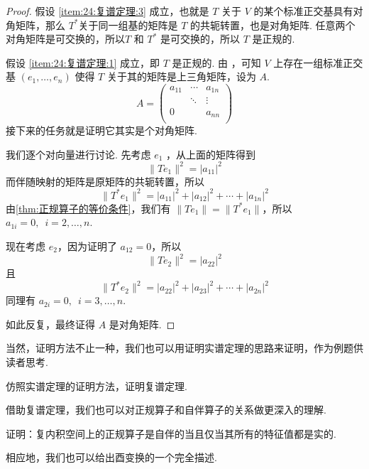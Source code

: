 \begin{proof}
    假设 \ref*{item:24:复谱定理:3} 成立，也就是 $ T $ 关于 $ V $ 的某个标准正交基具有对角矩阵，那么 $ T^* $关于同一组基的矩阵是 $ T $ 的共轭转置，也是对角矩阵. 任意两个对角矩阵是可交换的，所以$ T $ 和 $ T^* $ 是可交换的，所以 $ T $ 是正规的.

    假设 \ref*{item:24:复谱定理:1} 成立，即 $ T $ 是正规的. 由 ，可知 $ V $ 上存在一组标准正交基 $ (e_1, \ldots , e_n) $ 使得 $ T $ 关于其的矩阵是上三角矩阵，设为 $ A $.
    \[ A = \begin{pmatrix}
            a_{11} & \cdots & a_{1n} \\
                   & \ddots & \vdots \\
            0      &        & a_{nn} \\
        \end{pmatrix} \]
    接下来的任务就是证明它其实是个对角矩阵.

    我们逐个对向量进行讨论. 先考虑 $ e_1 $ ，从上面的矩阵得到
    \[ \lVert Te_1 \rVert^2 = \lvert a_{11} \rvert^2 \]
    而伴随映射的矩阵是原矩阵的共轭转置，所以
    \[ \lVert T^*e_1 \rVert^2 = \lvert a_{11} \rvert^2 + \lvert a_{12} \rvert^2 + \cdots + \lvert a_{1n} \rvert^2 \]
    由\autoref{thm:正规算子的等价条件}，我们有 $ \lVert Te_1 \rVert = \lVert T^*e_1 \rVert $，所以 $ a_{1i} = 0,\enspace i = 2, \ldots , n $.

    现在考虑 $ e_2 $，因为证明了 $ a_{12} = 0 $，所以
    \[ \lVert Te_2 \rVert^2 = \lvert a_{22} \rvert^2 \]
    且
    \[ \lVert T^*e_2 \rVert^2 = \lvert a_{22} \rvert^2 + \lvert a_{23} \rvert^2 + \cdots + \lvert a_{2n} \rvert^2 \]
    同理有 $ a_{2i} = 0,\enspace i = 3, \ldots , n $.

    如此反复，最终证得 $ A $ 是对角矩阵.
\end{proof}

当然，证明方法不止一种，我们也可以用证明实谱定理的思路来证明，作为例题供读者思考.

\begin{example}{}{}
    仿照实谱定理的证明方法，证明复谱定理.
\end{example}

借助复谱定理，我们也可以对正规算子和自伴算子的关系做更深入的理解.

\begin{example}{}{}
    证明：复内积空间上的正规算子是自伴的当且仅当其所有的特征值都是实的.
\end{example}

相应地，我们也可以给出酉变换的一个完全描述.

